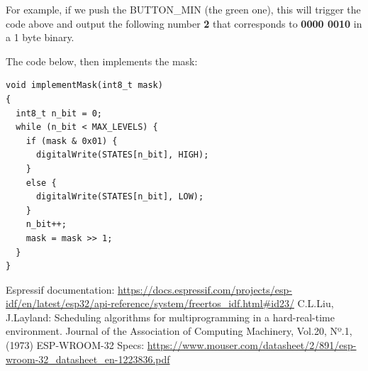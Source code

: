 \documentclass[11pt]{article}
\begin{document}
For example, if we push the BUTTON\_MIN (the green one), this will trigger the code above and output the following number \textbf{2} that corresponds to \textbf{0000 0010} in a 1 byte binary. 

The code below, then implements the mask:

\begin{verbatim}
void implementMask(int8_t mask)
{
  int8_t n_bit = 0;
  while (n_bit < MAX_LEVELS) {
    if (mask & 0x01) {
      digitalWrite(STATES[n_bit], HIGH);
    }
    else {
      digitalWrite(STATES[n_bit], LOW);
    }
    n_bit++;
    mask = mask >> 1;
  }
}
\end{verbatim}

\newpage
\begin{thebibliography}{8}

 Espressif documentation: {\url{https://docs.espressif.com/projects/esp-idf/en/latest/esp32/api-reference/system/freertos_idf.html#id23/}}
  C.L.Liu, J.Layland: Scheduling algorithms for multiprogramming in a hard-real-time environment. Journal of the Association of Computing Machinery, Vol.20, Nº.1, (1973)
 ESP-WROOM-32 Specs:  {\url{https://www.mouser.com/datasheet/2/891/esp-wroom-32_datasheet_en-1223836.pdf}}

\end{thebibliography}
\end{document}
